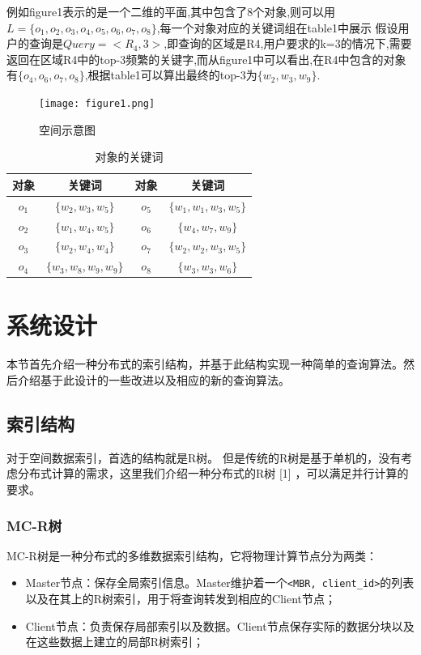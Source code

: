 \documentclass{elegantpaper}
\begin{document}
例如figure1表示的是一个二维的平面,其中包含了8个对象,则可以用$L=\{o_1,o_2,o_3,o_4,o_5,o_6,o_7,o_8\}$,每一个对象对应的关键词组在table1中展示
假设用户的查询是$Query=<R_4,3>$,即查询的区域是R4,用户要求的k=3的情况下,需要返回在区域R4中的top-3频繁的关键字,而从figure1中可以看出,在R4中包含的对象有$\{o_4,o_6,o_7,o_8\}$,根据table1可以算出最终的top-3为$\{w_2,w_3,w_9\}$.

\begin{figure}[!ht]
	\centering
	\texttt{[image: figure1.png]}
	\caption{空间示意图\label{fig:figure1}}
\end{figure}

\begin{table}[!htbp]
    \centering
    \caption{对象的关键词}
      \begin{tabular}{cccc}
      对象&关键词&对象&关键词\\
      \hline
      $o_1$   & $\{w_2,w_3,w_5\}$ & $o_5$&$\{w_1,w_1,w_3,w_5\}$\\
      $o_2$   & $\{w_1,w_4,w_5\}$ & $o_6$&$\{w_4,w_7,w_9\}$\\
      $o_3$   & $\{w_2,w_4,w_4\}$ & $o_7$&$\{w_2,w_2,w_3,w_5\}$\\
      $o_4$   & $\{w_3,w_8,w_9,w_9\}$ & $o_8$&$\{w_3,w_3,w_6\}$\\
      \end{tabular}
\end{table}

\section{系统设计}

本节首先介绍一种分布式的索引结构，并基于此结构实现一种简单的查询算法。然后介绍基于此设计的一些改进以及相应的新的查询算法。

\subsection{索引结构}

对于空间数据索引，首选的结构就是R树。
但是传统的R树是基于单机的，没有考虑分布式计算的需求，这里我们介绍一种分布式的R树 [1] ，可以满足并行计算的要求。

\subsubsection{MC-R树}

MC-R树是一种分布式的多维数据索引结构，它将物理计算节点分为两类：

\begin{itemize}

    \item Master节点：保存全局索引信息。Master维护着一个\verb|<MBR, client_id>|的列表以及在其上的R树索引，用于将查询转发到相应的Client节点；
    
    \item Client节点：负责保存局部索引以及数据。Client节点保存实际的数据分块以及在这些数据上建立的局部R树索引；
    
\end{itemize}
\end{document}
